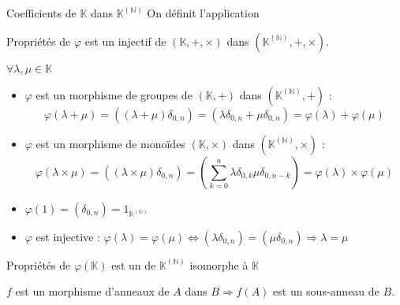 \documentclass[12pt,a4paper]{report}
\begin{document}
    \begin{definition}{Coefficients de $\mathbb{K}$ dans $\mathbb{K}^{(\mathbb{N})}$}{}
    On définit l'application 
    \end{definition}
    
    
    \begin{proposition}{Propriétés de $\varphi$}{}
    \strong{$\varphi$} est un  injectif de $(\mathbb{K}, +, \times)$ dans $\left(\mathbb{K}^{(\mathbb{N})}, +, \times \right)$.
    \end{proposition}
    
    \begin{demo}
    $\forall \lambda, \mu \in \mathbb{K}$
    \begin{itemize}
        \item $\varphi$ est un morphisme de groupes de $(\mathbb{K}, +)$ dans $(\mathbb{K}^{(\mathbb{N})}, +)$ :
        $$ \varphi(\lambda + \mu) = ((\lambda + \mu) \delta_{0,n}) = (\lambda \delta_{0,n} + \mu \delta_{0,n}) = \varphi(\lambda) + \varphi(\mu) $$
        \item $\varphi$ est un morphisme de monoïdes $(\mathbb{K}, \times)$ dans $(\mathbb{K}^{(\mathbb{N})}, \times)$ :
        $$ \varphi(\lambda \times \mu) = ((\lambda \times \mu) \delta_{0,n}) = \left( \sum_{k = 0}^n \lambda\delta_{0,k} \mu\delta_{0,n-k} \right) = \varphi(\lambda) \times \varphi(\mu) $$
        \item $\varphi(1) = (\delta_{0,n}) = 1_{\mathbb{K}^{(\mathbb{N})}}$
        \item $\varphi$ est injective : $ \varphi(\lambda) = \varphi(\mu) \Leftrightarrow (\lambda\delta_{0,n}) = (\mu\delta_{0,n}) \Rightarrow \lambda = \mu $
    \end{itemize}
    \end{demo}
    
    \begin{corollaire}{Propriétés de $\varphi(\mathbb{K})$}{}
     est un  de $\mathbb{K}^{(\mathbb{N})}$ isomorphe à $\mathbb{K}$
    \end{corollaire}
    
    
    \begin{demo}
    $f$ est un morphisme d'anneaux de $A$ dans $B \Rightarrow f(A)$ est un sous-anneau de $B$.
    \end{demo}
    
\end{document}
